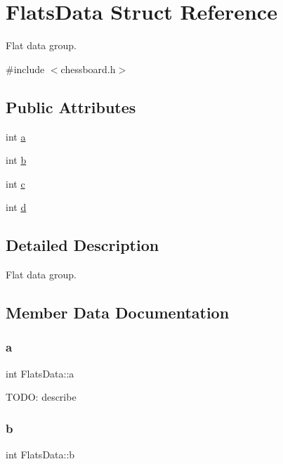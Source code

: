 \hypertarget{struct_flats_data}{}\section{Flats\+Data Struct Reference}
\label{struct_flats_data}


Flat data group.  




{\ttfamily \#include $<$chessboard.\+h$>$}

\subsection*{Public Attributes}
\begin{DoxyCompactItemize}
\item 
int \hyperlink{struct_flats_data_ab05a4bc13a98636cf93edfc965afb462}{a}
\item 
int \hyperlink{struct_flats_data_aaca73684b48fe7211c676b721bc3ba9d}{b}
\item 
int \hyperlink{struct_flats_data_a19152c81d88747bd221d1bd2e2a01077}{c}
\item 
int \hyperlink{struct_flats_data_a2244298a5ff35dcd06d54b283b485e35}{d}
\end{DoxyCompactItemize}


\subsection{Detailed Description}
Flat data group. 

\subsection{Member Data Documentation}
\mbox{\label{struct_flats_data_ab05a4bc13a98636cf93edfc965afb462}} 
\subsubsection{\texorpdfstring{a}{a}}
{\footnotesize\ttfamily int Flats\+Data\+::a}

T\+O\+DO\+: describe \mbox{\label{struct_flats_data_aaca73684b48fe7211c676b721bc3ba9d}} 
\subsubsection{\texorpdfstring{b}{b}}
{\footnotesize\ttfamily int Flats\+Data\+::b}

